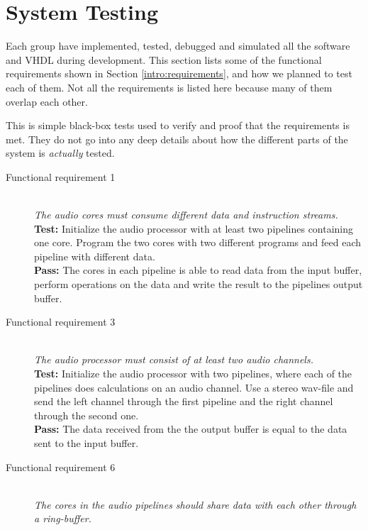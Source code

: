 \section{System Testing}
Each group have implemented, tested, debugged and simulated all the
software and VHDL during development. This section lists some of the
functional requirements shown in Section \ref{intro:requirements},
and how we planned to test each of them. Not all the requirements
is listed here because many of them overlap each other.

This is simple black-box tests used to verify and proof that
the requirements is met. They do not go into any deep details about
how the different parts of the system is \textit{actually} tested.

\begin{description}
    \item[Functional requirement 1] \hfill \\
        \textit{The audio cores must consume different data and instruction streams.} \\
        \textbf{Test:} Initialize the audio processor with at least two pipelines
        containing one core. Program the two cores with two different programs and feed
        each pipeline with different data.\\
        \textbf{Pass:} The cores in each pipeline is able to read data from the input buffer,
        perform operations on the data and write the result to the pipelines output buffer.\\
    \item[Functional requirement 3] \hfill \\
        \textit{The audio processor must consist of at least two audio channels.} \\
        \textbf{Test:} Initialize the audio processor with two pipelines, where each of the 
        pipelines does calculations on an audio channel. Use a stereo wav-file and send
        the left channel through the first pipeline and the right channel through the
        second one. \\
        \textbf{Pass:} The data received from the the output buffer is equal to the
        data sent to the input buffer. \\
    \item[Functional requirement 6] \hfill \\
        \textit{The cores in the audio pipelines should share data with each other through a ring-buffer.} \\

\end{description}

